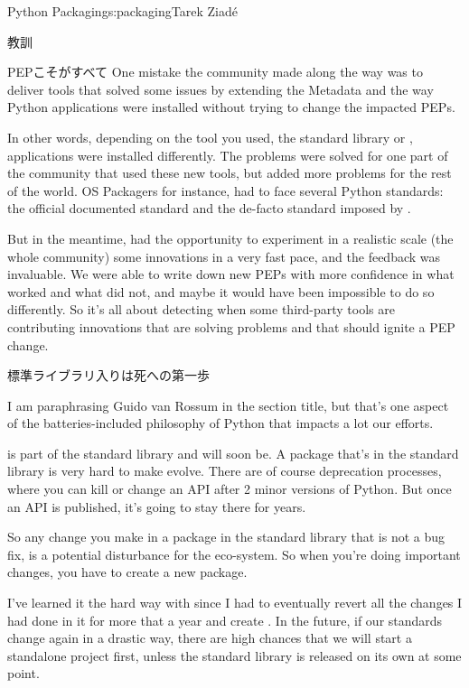 \begin{aosachapter}{Python Packaging}{s:packaging}{Tarek Ziad\'{e}}
\begin{aosasect1}{教訓}
\begin{aosasect2}{PEPこそがすべて}
One mistake the community made along the way was to deliver tools 
that solved some issues by extending the Metadata and the way Python 
applications were installed without trying to change the impacted 
PEPs.

In other words, depending on the tool you used, the standard library
 or , applications were installed
differently. The problems were solved for one part of the community 
that used these new tools, but added more problems for the rest of 
the world.
OS Packagers for instance, had to face several Python standards:
the official documented standard and the de-facto standard imposed by 
.

But in the meantime,  had the opportunity to experiment
in a realistic scale (the whole community) some innovations in a
very fast pace, and the feedback was invaluable. We were able to 
write down new PEPs with more confidence in what worked and what did not,
and maybe it would have been impossible to do so differently.
So it's all about detecting when some third-party tools are contributing
innovations that are solving problems and that should ignite a PEP
change.

\end{aosasect2}

\begin{aosasect2}{標準ライブラリ入りは死への第一歩}

I am paraphrasing Guido van Rossum in the section title, but that's
one aspect of the batteries-included philosophy of Python that 
impacts a lot our efforts.

 is part of the standard library and  
will soon be. A package that's in the standard library is very hard to 
make evolve. There are of course deprecation processes, where you can kill 
or change an API after 2 minor versions of Python. But once an API is 
published, it's going to stay there for years.

So any change you make in a package in the standard library that is 
not a bug fix, is a potential disturbance for the eco-system. So when 
you're doing important changes, you have to create a new package.

I've learned it the hard way with  since I had to eventually
revert all the changes I had done in it for more that a year and create
. In the future, if our standards change again in a drastic 
way, there are high chances that we will start a standalone 
project first, unless the standard library is released on its own at some point.


\end{aosasect2}
\end{aosasect1}
\end{aosachapter}
